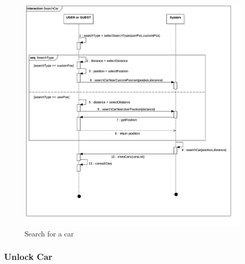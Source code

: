 \begin{center}
\begin{figure}[H]
\includegraphics[scale=0.25]{UML/png/Collaboration4__Interaction1__SearchCar_4}

\caption{Search for a car}

\end{figure}
\par\end{center}

\subsubsection{Unlock Car}

